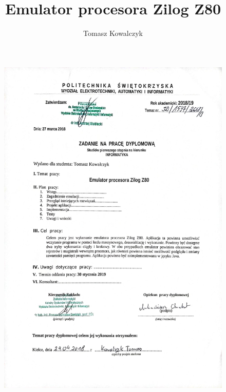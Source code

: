 \documentclass[12pt,a4paper]{report}
\begin{document}
	
	
	\author{Tomasz Kowalczyk}
	\title{Emulator procesora Zilog Z80}
	\maketitle
	
	\leavevmode\thispagestyle{empty}\newpage
	
	\pagestyle{empty}
	\begin{figure}[H]
		\vspace{-2.5cm}
		\hspace{-3.5cm}
		\includegraphics[width=1.0\paperwidth]{skany/zadanie.jpg}
	\end{figure}
	
	\leavevmode\thispagestyle{empty}\newpage
	
\end{document}
